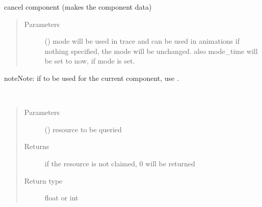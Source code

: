 \documentclass[letterpaper,10pt,english]{sphinxmanual}
\begin{document}
\begin{fulllineitems}
\begin{fulllineitems}
\begin{quote}
\begin{description}
\end{description}\end{quote}

\end{fulllineitems}


\begin{fulllineitems}
\label{\detokenize{Reference:salabim.Component.cancel}}
cancel component (makes the component data)
\begin{quote}\begin{description}
\item[{Parameters}] \leavevmode
{} () \textendash{} mode 
will be used in trace and can be used in animations 
if nothing specified, the mode will be unchanged. 
also mode\_time will be set to now, if mode is set.

\end{description}\end{quote}

\begin{sphinxadmonition}{note}{Note:}
if to be used for the current component, use .
\end{sphinxadmonition}

\end{fulllineitems}


\begin{fulllineitems}
\label{\detokenize{Reference:salabim.Component.claimed_quantity}}~\begin{quote}\begin{description}
\item[{Parameters}] \leavevmode
{} () \textendash{} resource to be queried

\item[{Returns}] \leavevmode
{} \textendash{} if the resource is not claimed, 0 will be returned

\item[{Return type}] \leavevmode
float or int

\end{description}\end{quote}


\end{fulllineitems}
\end{fulllineitems}
\end{document}
